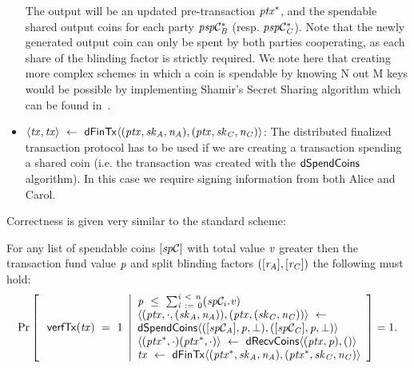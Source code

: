\begin{definition}
\begin{itemize}
        The output will be an updated pre-transaction $\mathit{ptx}^*$, and the spendable shared output coins for each party $\mathit{psp}\mathcal{C}_{\mathit{B}}^*$ (resp. $\mathit{psp}\mathcal{C}_{\mathit{C}}^*$).
        Note that the newly generated output coin can only be spent by both parties cooperating, as each share of the blinding factor is strictly required.
        We note here that creating more complex schemes in which a coin is spendable by knowing N out M keys would be possible by implementing Shamir's Secret Sharing algorithm which can be found in~\cite{shamir1979share}.
        \item $\langle \mathit{tx}, \mathit{tx} \rangle ~\leftarrow~ \mathsf{dFinTx} \langle(\mathit{ptx},\mathit{sk}_{\mathit{A}},\mathit{\mathit{n}_{\mathit{A}}}),(\mathit{ptx},\mathit{sk}_{\mathit{C}},\mathit{\mathit{n}_{\mathit{C}}})\rangle$: The distributed finalized transaction protocol has to be used if we are creating a transaction spending a shared coin (i.e. the transaction was created with the $\mathsf{dSpendCoins}$ algorithm).
        In this case we require signing information from both Alice and Carol.
    \end{itemize}
\end{definition}

Correctness is given very similar to the standard scheme:

\begin{definition}
    \label{def:atom:ext-tx-scheme-correctness}
    For any list of spendable coins $[\mathit{sp}\mathcal{C}]$ with total value $\mathit{v}$ greater then the transaction fund value $\mathit{p}$ and split blinding factors $([\mathit{r}_{\mathit{A}}], [\mathit{r}_{\mathit{C}}])$ the following must hold:
    \[
        \Pr\left[
        \begin{array}{c}
            \: \mathsf{verfTx}(\mathit{tx}) ~=~ 1
        \end{array}
        \middle\vert
        \begin{array}{l}
            \mathit{p} ~\leq~ \sum_{\mathit{i} ~:=~ 0}^{\mathit{i} ~<~ \mathit{n}}(\mathit{sp}\mathcal{C}_{i}.\mathit{v}) \\
            \langle (\mathit{ptx}, \cdot, (\mathit{sk}_{\mathit{A}}, \mathit{\mathit{n}_{\mathit{A}}})), (\mathit{ptx}, (\mathit{sk}_{\mathit{C}}, \mathit{\mathit{n}_{\mathit{C}}})) \rangle ~\leftarrow~ \\
            \mathsf{dSpendCoins} \langle ([\mathit{sp}\mathcal{C}_{\mathit{A}}],\mathit{p},\bot), ([\mathit{sp}\mathcal{C}_{\mathit{C}}],\mathit{p},\bot) \rangle \\
            \langle (\mathit{ptx}^*, \cdot)(\mathit{ptx}^*, \cdot) \rangle ~\leftarrow~ \mathsf{dRecvCoins} \langle(\mathit{ptx},\mathit{p}), () \rangle \\
            \mathit{tx} ~\leftarrow~ \mathsf{dFinTx} \langle(\mathit{ptx}^*,\mathit{sk}_{\mathit{A}},\mathit{\mathit{n}_{\mathit{A}}}),(\mathit{ptx}^*,\mathit{sk}_{\mathit{C}},\mathit{\mathit{n}_{\mathit{C}}})\rangle
        \end{array}
        \right]=1.
    \]
\end{definition}

